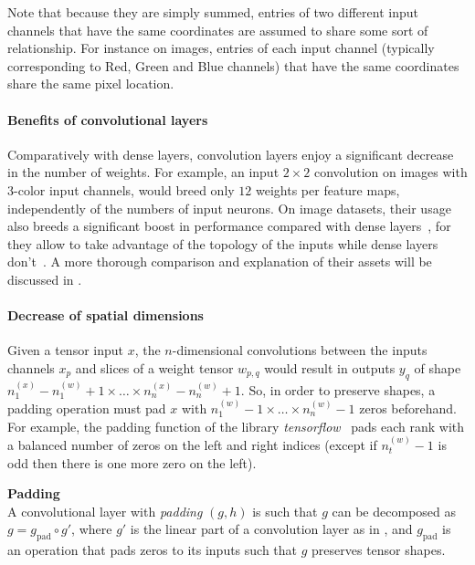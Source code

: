 \begin{remark}
Note that because they are simply summed, entries of two different input channels that have the same coordinates are assumed to share some sort of relationship. For instance on images, entries of each input channel (typically corresponding to Red, Green and Blue channels) that have the same coordinates share the same pixel location.
\end{remark}

\paragraph{Benefits of convolutional layers}
Comparatively with dense layers, convolution layers enjoy a significant decrease in the number of weights. For example, an input $2 \times 2$ convolution on images with $3$-color input channels, would breed only $12$ weights per feature maps, independently of the numbers of input neurons. On image datasets, their usage also breeds a significant boost in performance compared with dense layers~\citep{krizhevsky2012imagenet}, for they allow to take advantage of the topology of the inputs while dense layers don't~\citep{lecun1995convolutional}. A more thorough comparison and explanation of their assets will be discussed in .

\paragraph{Decrease of spatial dimensions}
Given a tensor input $x$, the $n$-dimensional convolutions between the inputs channels $x_p$ and slices of a weight tensor $w_{p,q}$ would result in outputs $y_q$ of shape $n_1^{(x)} - n_1^{(w)} + 1 \times \ldots \times n_n^{(x)} - n_n^{(w)} + 1$. So, in order to preserve shapes, a padding operation must pad $x$ with $n_1^{(w)} - 1 \times \ldots \times n_n^{(w)} - 1$ zeros beforehand. For example, the padding function of the library \emph{tensorflow}~\citep{tensorflow2015-whitepaper} pads each rank with a balanced number of zeros on the left and right indices (except if $n_t^{(w)} - 1$ is odd then there is one more zero on the left).

\begin{definition}\textbf{Padding}\\
A convolutional layer with \emph{padding} $(g, h)$ is such that $g$ can be decomposed as $g = g_\text{pad} \circ g'$, where $g'$ is the linear part of a convolution layer as in , and $g_\text{pad}$ is an operation that pads zeros to its inputs such that $g$ preserves tensor shapes.
\end{definition}

